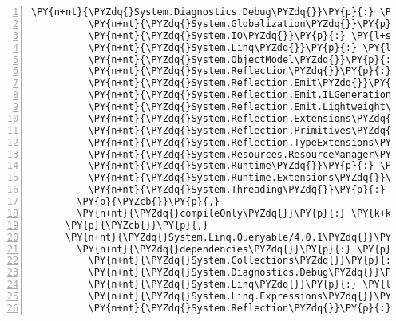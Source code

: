 \begin{Verbatim}[commandchars=\\\{\},numbers=left,firstnumber=1,stepnumber=1,numberblanklines=0]
          \PY{n+nt}{\PYZdq{}System.Diagnostics.Debug\PYZdq{}}\PY{p}{:} \PY{l+s+s2}{\PYZdq{}4.3.0\PYZdq{}}\PY{p}{,}
          \PY{n+nt}{\PYZdq{}System.Globalization\PYZdq{}}\PY{p}{:} \PY{l+s+s2}{\PYZdq{}4.3.0\PYZdq{}}\PY{p}{,}
          \PY{n+nt}{\PYZdq{}System.IO\PYZdq{}}\PY{p}{:} \PY{l+s+s2}{\PYZdq{}4.3.0\PYZdq{}}\PY{p}{,}
          \PY{n+nt}{\PYZdq{}System.Linq\PYZdq{}}\PY{p}{:} \PY{l+s+s2}{\PYZdq{}4.3.0\PYZdq{}}\PY{p}{,}
          \PY{n+nt}{\PYZdq{}System.ObjectModel\PYZdq{}}\PY{p}{:} \PY{l+s+s2}{\PYZdq{}4.3.0\PYZdq{}}\PY{p}{,}
          \PY{n+nt}{\PYZdq{}System.Reflection\PYZdq{}}\PY{p}{:} \PY{l+s+s2}{\PYZdq{}4.3.0\PYZdq{}}\PY{p}{,}
          \PY{n+nt}{\PYZdq{}System.Reflection.Emit\PYZdq{}}\PY{p}{:} \PY{l+s+s2}{\PYZdq{}4.3.0\PYZdq{}}\PY{p}{,}
          \PY{n+nt}{\PYZdq{}System.Reflection.Emit.ILGeneration\PYZdq{}}\PY{p}{:} \PY{l+s+s2}{\PYZdq{}4.3.0\PYZdq{}}\PY{p}{,}
          \PY{n+nt}{\PYZdq{}System.Reflection.Emit.Lightweight\PYZdq{}}\PY{p}{:} \PY{l+s+s2}{\PYZdq{}4.3.0\PYZdq{}}\PY{p}{,}
          \PY{n+nt}{\PYZdq{}System.Reflection.Extensions\PYZdq{}}\PY{p}{:} \PY{l+s+s2}{\PYZdq{}4.3.0\PYZdq{}}\PY{p}{,}
          \PY{n+nt}{\PYZdq{}System.Reflection.Primitives\PYZdq{}}\PY{p}{:} \PY{l+s+s2}{\PYZdq{}4.3.0\PYZdq{}}\PY{p}{,}
          \PY{n+nt}{\PYZdq{}System.Reflection.TypeExtensions\PYZdq{}}\PY{p}{:} \PY{l+s+s2}{\PYZdq{}4.3.0\PYZdq{}}\PY{p}{,}
          \PY{n+nt}{\PYZdq{}System.Resources.ResourceManager\PYZdq{}}\PY{p}{:} \PY{l+s+s2}{\PYZdq{}4.3.0\PYZdq{}}\PY{p}{,}
          \PY{n+nt}{\PYZdq{}System.Runtime\PYZdq{}}\PY{p}{:} \PY{l+s+s2}{\PYZdq{}4.3.0\PYZdq{}}\PY{p}{,}
          \PY{n+nt}{\PYZdq{}System.Runtime.Extensions\PYZdq{}}\PY{p}{:} \PY{l+s+s2}{\PYZdq{}4.3.0\PYZdq{}}\PY{p}{,}
          \PY{n+nt}{\PYZdq{}System.Threading\PYZdq{}}\PY{p}{:} \PY{l+s+s2}{\PYZdq{}4.3.0\PYZdq{}}
        \PY{p}{\PYZcb{}}\PY{p}{,}
        \PY{n+nt}{\PYZdq{}compileOnly\PYZdq{}}\PY{p}{:} \PY{k+kc}{true}
      \PY{p}{\PYZcb{}}\PY{p}{,}
      \PY{n+nt}{\PYZdq{}System.Linq.Queryable/4.0.1\PYZdq{}}\PY{p}{:} \PY{p}{\PYZob{}}
        \PY{n+nt}{\PYZdq{}dependencies\PYZdq{}}\PY{p}{:} \PY{p}{\PYZob{}}
          \PY{n+nt}{\PYZdq{}System.Collections\PYZdq{}}\PY{p}{:} \PY{l+s+s2}{\PYZdq{}4.3.0\PYZdq{}}\PY{p}{,}
          \PY{n+nt}{\PYZdq{}System.Diagnostics.Debug\PYZdq{}}\PY{p}{:} \PY{l+s+s2}{\PYZdq{}4.3.0\PYZdq{}}\PY{p}{,}
          \PY{n+nt}{\PYZdq{}System.Linq\PYZdq{}}\PY{p}{:} \PY{l+s+s2}{\PYZdq{}4.3.0\PYZdq{}}\PY{p}{,}
          \PY{n+nt}{\PYZdq{}System.Linq.Expressions\PYZdq{}}\PY{p}{:} \PY{l+s+s2}{\PYZdq{}4.3.0\PYZdq{}}\PY{p}{,}
          \PY{n+nt}{\PYZdq{}System.Reflection\PYZdq{}}\PY{p}{:} \PY{l+s+s2}{\PYZdq{}4.3.0\PYZdq{}}\PY{p}{,}

\end{Verbatim}
